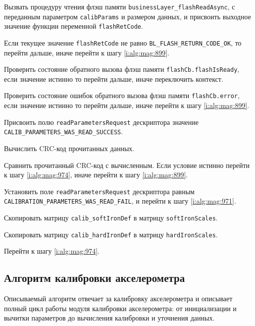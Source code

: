 \begin{enumerate_step}
    \item Вызвать процедуру чтения флэш памяти \lstinline|businessLayer_flashReadAsync|, с переданным параметром \lstinline|calibParams| и размером данных, и присвоить выходное значение функции переменной \lstinline|flashRetCode|.
    \item Если текущее значение \lstinline|flashRetCode| не равно \lstinline|BL_FLASH_RETURN_CODE_OK|, то перейти дальше, иначе перейти к шагу
    \ref{i:alg:mag:899}.
    \item Проверить состояние обратного вызова флэш памяти \lstinline|flashCb.flashIsReady|, если значение истинно то перейти дальше, иначе переключить контекст.
    \item Проверить состояние ошибок обратного вызова флэш памяти \lstinline|flashCb.error|, если значение истинно то перейти дальше, иначе перейти к шагу \ref{i:alg:mag:899}.
    \item Присвоить полю \lstinline|readParametersRequest| дескриптора значение \lstinline|CALIB_PARAMETERS_WAS_READ_SUCCESS|.
    \item Вычислить CRC-код прочитанных данных.
    \item Сравнить прочитанный CRC-код с вычисленным. Если условие истинно перейти к шагу \ref{i:alg:mag:974}, иначе перейти к шагу \ref{i:alg:mag:899}.
    \item \label{i:alg:mag:899} Установить поле \lstinline|readParametersRequest| дескриптора равным \lstinline|CALIBRATION_PARAMETERS_WAS_READ_FAIL|, и перейти к шагу \ref{i:alg:mag:971}.
    \item \label{i:alg:mag:971} Скопировать матрицу \lstinline|calib_softIronDef| в матрицу \lstinline|softIronScales|.
    \item Скопировать матрицу \lstinline|calib_hardIronDef| в матрицу \lstinline|hardIronScales|.
    \item Перейти к шагу \ref{i:alg:mag:974}.
\end{enumerate_step}

\subsection{Алгоритм калибровки акселерометра}

Описываемый алгоритм отвечает за калибровку акселерометра и описывает полный цикл работы модуля калибровки акселерометра: от инициализации и вычитки параметров до
вычисления калибровки и уточнения данных. 


